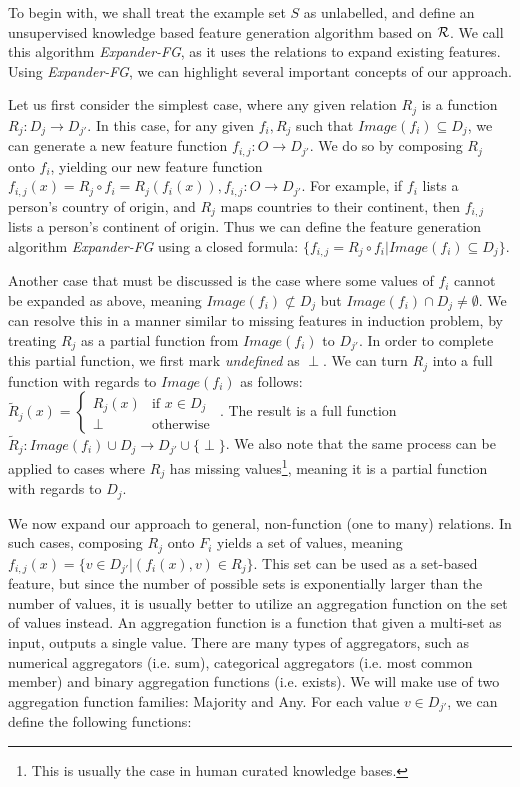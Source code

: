 \documentclass[twoside,11pt]{article}
\theoremstyle{definition}
\begin{document}
To begin with, we shall treat the example set $S$ as unlabelled, and define an unsupervised knowledge based feature generation algorithm based on ${\cal R}$. We call this algorithm \emph{Expander-FG}, as it uses the relations to expand existing features. Using \emph{Expander-FG}, we can highlight several important concepts of our approach.

Let us first consider the simplest case, where any given relation $R_j$ is a function $R_j:D_j\rightarrow D_{j'}$. In this case, for any given $f_i,R_j$ such that 
$Image(f_i) \subseteq D_j$, we can generate a new feature function $f_{i,j}:O\rightarrow D_{j'}$. We do so by composing $R_j$ onto $f_i$, yielding our new feature function  $f_{i,j}(x)=R_j\circ f_i=R_j(f_i(x)),f_{i,j}:O\rightarrow D_{j'}$. For example, if $f_i$ lists a person's country of origin, and $R_j$ maps countries to their continent, then $f_{i,j}$ lists a person's continent of origin.
Thus we can define the feature generation algorithm \emph{Expander-FG} using a closed formula: $\{f_{i,j}=R_j\circ f_i|Image(f_i) \subseteq D_j\}$.

Another case that must be discussed is the case where some values of $f_i$ cannot be expanded as above, meaning $Image(f_i) \not\subset D_j$ but $Image(f_i) \cap D_j \neq\emptyset$. We can resolve this in a manner similar to missing features in induction problem, by treating $R_j$ as a partial function from $Image(f_i)$ to $D_{j'}$. In order to complete this partial function, we first mark \emph{undefined} as $\perp$. We can turn $R_j$ into a full function with regards to $Image(f_i)$ as follows: $\tilde{R}_j(x)=\begin{cases} R_j(x) &\mbox{if } x\in D_j\\ 
\perp & \mbox{otherwise } \end{cases}$.
The result is a full function $\tilde{R}_j:Image(f_i)\cup D_j\rightarrow D_{j'}\cup\{\perp\}$. We also note that the same process can be applied to cases where $R_j$ has missing values\footnote{This is usually the case in human curated knowledge bases.}, meaning it is a partial function with regards to $D_j$. 

We now expand our approach to general, non-function (one to many) relations. 
In such cases, composing $R_j$ onto $F_i$ yields a set of values, meaning $f_{i,j}(x)=\{v\in D_{j'}|(f_i(x),v)\in R_j\}$. 
 This set can be used as a set-based feature, but since the number of possible sets is exponentially larger than the number of values, it is usually better to utilize an aggregation function on the set of values instead. An aggregation function is a function that given a multi-set as input, outputs a single value. There are many types of aggregators, such as numerical aggregators (i.e. sum), categorical aggregators (i.e. most common member) and binary aggregation functions (i.e. exists).
 We will make use of two aggregation function families: Majority and Any.
 For each value $v\in D_{j'}$, we can define the following functions:
 
\end{document}
